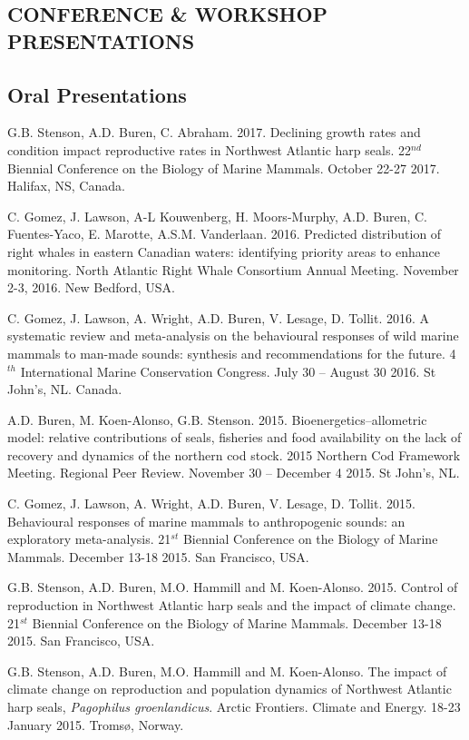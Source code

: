 \documentclass{res}
\begin{document}
\begin{resume}
\section{CONFERENCE \& WORKSHOP PRESENTATIONS}
\subsection{Oral Presentations}
\begin{hangparas}{.4in}{1}
G.B. Stenson, A.D. Buren, C. Abraham. 2017. Declining growth rates and condition impact reproductive rates in Northwest Atlantic harp seals. 22$^{nd}$ Biennial Conference on the Biology of Marine Mammals. October 22-27 2017. Halifax, NS, Canada.

C. Gomez,  J. Lawson, A-L Kouwenberg, H. Moors-Murphy, A.D. Buren, C. Fuentes-Yaco, E.  Marotte, A.S.M. Vanderlaan. 2016. Predicted distribution of right whales in eastern Canadian waters: identifying priority areas to enhance monitoring. North Atlantic Right Whale Consortium Annual Meeting. November 2-3, 2016. New Bedford, USA.

C. Gomez, J. Lawson, A. Wright, A.D. Buren, V. Lesage, D. Tollit. 2016. A systematic review and meta-analysis on the behavioural responses of wild marine mammals to man-made sounds: synthesis and recommendations for the future. 4$^{th}$ International Marine Conservation Congress. July 30 – August 30 2016. St John's, NL. Canada.

A.D. Buren, M. Koen-Alonso, G.B. Stenson. 2015. Bioenergetics–allometric model: relative contributions of seals, fisheries and food availability on the lack of recovery and dynamics of the northern cod stock. 2015 Northern Cod Framework Meeting. Regional Peer Review. November 30 – December 4 2015. St John's, NL.

C. Gomez, J. Lawson, A. Wright, A.D. Buren, V. Lesage, D. Tollit. 2015. Behavioural responses of marine mammals to anthropogenic sounds: an exploratory meta-analysis. 21$^{st}$ Biennial Conference on the Biology of Marine Mammals. December 13-18 2015. San Francisco, USA.

G.B. Stenson, A.D. Buren, M.O. Hammill and M. Koen-Alonso. 2015. Control of reproduction in Northwest Atlantic harp seals and the impact of climate change. 21$^{st}$ Biennial Conference on the Biology of Marine Mammals. December 13-18 2015. San Francisco, USA.

G.B. Stenson, A.D. Buren, M.O. Hammill and M. Koen-Alonso. The impact of climate change on reproduction and population dynamics of Northwest Atlantic harp seals, \textit{Pagophilus groenlandicus}. Arctic Frontiers. Climate and Energy. 18-23 January 2015. Troms{\o}, Norway.


\end{hangparas}
\end{resume}
\end{document}
